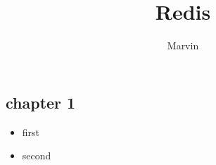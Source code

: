\documentclass[a4paper,10pt]{article}
\title{Redis}
\author{Marvin}
\date{}
\begin{document}
\begin{CJK*}{UTF8}{gkai}

\newpage
\section{chapter 1}
\begin{itemize}
\item
first
\item
second
\end{itemize}



\end{CJK*}
\end{document}
